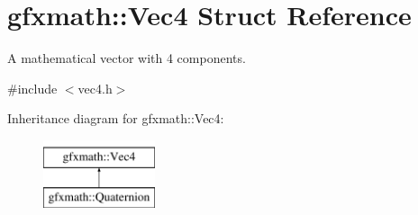 \hypertarget{structgfxmath_1_1_vec4}{}\section{gfxmath\+:\+:Vec4 Struct Reference}
\label{structgfxmath_1_1_vec4}


A mathematical vector with 4 components.  




{\ttfamily \#include $<$vec4.\+h$>$}

Inheritance diagram for gfxmath\+:\+:Vec4\+:\begin{figure}[H]
\begin{center}
\leavevmode
\includegraphics[height=2.000000cm]{structgfxmath_1_1_vec4}
\end{center}
\end{figure}
